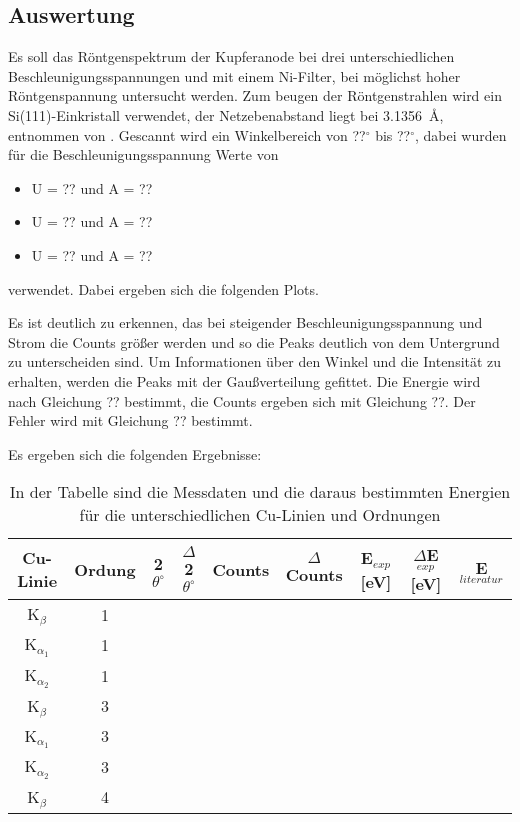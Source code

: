 \subsection{Auswertung}
Es soll das R\"ontgenspektrum der Kupferanode bei drei unterschiedlichen Beschleunigungsspannungen und mit einem Ni-Filter, bei m\"oglichst hoher R\"ontgenspannung untersucht werden.
Zum beugen der R\"ontgenstrahlen wird ein Si(111)-Einkristall verwendet, der Netzebenabstand liegt bei \SI{3,1356}{\angstrom}, entnommen von \cite{si_a}.
Gescannt wird ein Winkelbereich von ??$^\circ$ bis ??$^\circ$, dabei wurden f\"ur die Beschleunigungsspannung Werte von
\begin{itemize}
\item U = ?? und A = ??
\item U = ?? und A = ??
\item U = ?? und A = ??
\end{itemize}
 verwendet. Dabei ergeben sich die folgenden Plots.
 
 
 
Es ist deutlich zu erkennen, das bei steigender Beschleunigungsspannung und Strom die Counts gr\"o\ss er werden und so die Peaks deutlich von dem Untergrund zu unterscheiden sind.
Um Informationen \"uber den Winkel und die Intensit\"at zu erhalten, werden die Peaks mit der Gau\ss verteilung gefittet.
Die Energie wird nach Gleichung ?? bestimmt, die Counts ergeben sich mit Gleichung ??. Der Fehler wird mit Gleichung ?? bestimmt.

Es ergeben sich die folgenden Ergebnisse:

\begin{table}[H]
\caption{In der Tabelle sind die Messdaten und die daraus bestimmten Energien für die unterschiedlichen Cu-Linien und Ordnungen}
\label{tab:ergebnisse_1}
\centering
\begin{tabular}{|c|c|c|c|c|c|c|c|c|}
\hline Cu-Linie & Ordung & 2$\theta^\circ$ & $\Delta$2$\theta^\circ$ & Counts & $\Delta$Counts & E$_{exp}$[eV] & $\Delta$E$_{exp}$[eV] & E$_{literatur}$ \\ 
\hline K$_\beta$ & 1 &  &  &  &  &  &  &  \\ 
\hline K$_{\alpha_1}$ & 1 &  &  &  &  &  &  &  \\ 
\hline K$_{\alpha_2}$ & 1 &  &  &  &  &  &  &  \\ 
\hline K$_\beta$ & 3 &  &  &  &  &  &  &  \\ 
\hline K$_{\alpha_1}$ & 3 &  &  &  &  &  &  &  \\ 
\hline K$_{\alpha_2}$ & 3 &  &  &  &  &  &  &  \\ 
\hline K$_\beta$ & 4 &  &  &  &  &  &  &  \\ 
\hline 
\end{tabular}
\end{table}